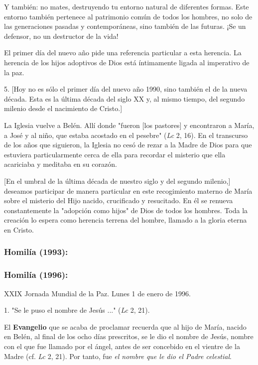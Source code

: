 \begin{body}
Y también: no mates, destruyendo tu entorno natural de diferentes
formas. Este entorno también pertenece al patrimonio común de todos los
hombres, no solo de las generaciones pasadas y contemporáneas, sino
también de las futuras. ¡Se un defensor, no un destructor de la vida!

El primer día del nuevo año pide una referencia particular a esta
herencia. La herencia de los hijos adoptivos de Dios está íntimamente
ligada al imperativo de la paz.

5. {[}Hoy no es sólo el primer día del nuevo año 1990, sino también el
de la nueva década. Esta es la última década del siglo XX y, al mismo
tiempo, del segundo milenio desde el nacimiento de Cristo.{]}

La Iglesia vuelve a Belén. Allí donde "fueron {[}los pastores{]} y
encontraron a María, a José y al niño, que estaba acostado en el
pesebre" (\emph{Lc} 2, 16). En el transcurso de los años que siguieron,
la Iglesia no cesó de rezar a la Madre de Dios para que estuviera
particularmente cerca de ella para recordar el misterio que ella
acariciaba y meditaba en su corazón.

{[}En el umbral de la última década de nuestro siglo y del segundo
milenio,{]} deseamos participar de manera particular en este
recogimiento materno de María sobre el misterio del Hijo nacido,
crucificado y resucitado. En él se renueva constantemente la "adopción
como hijos" de Dios de todos los hombres. Toda la creación lo espera
como herencia terrena del hombre, llamado a la gloria eterna en Cristo.

\subsubsection{Homilía (1993): }

\subsubsection{Homilía (1996): }

XXIX Jornada Mundial de la Paz. Lunes 1 de enero de 1996.

1. "Se le puso el nombre de Jesús ..." (\emph{Lc} 2, 21).

El \textbf{Evangelio} que se acaba de proclamar recuerda que al hijo de María, nacido en Belén, al final de los ocho días prescritos, se le dio el nombre de Jesús, nombre con el que fue llamado por el ángel, antes de ser concebido en el vientre de la Madre (cf. \emph{Lc} 2, 21). Por tanto, fue \emph{el nombre que le dio el Padre celestial}.


\end{body}
